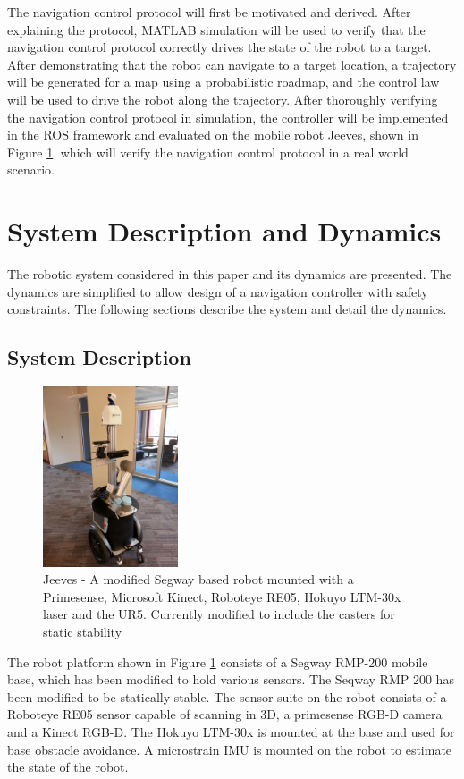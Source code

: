 \documentclass[journal]{IEEEtran}
\begin{document}
The navigation control protocol will first be motivated and derived. After explaining the protocol, MATLAB simulation will be used to verify that the navigation control protocol correctly drives the state of the robot to a target. After demonstrating that the robot can navigate to a target location, a trajectory will be generated for a map using a probabilistic roadmap, and the control law will be used to drive the robot along the trajectory. After thoroughly verifying the navigation control protocol in simulation, the controller will be implemented in the ROS framework and evaluated on the mobile robot Jeeves, shown in Figure \ref{fig:jeeves}, which will verify the navigation control protocol in a real world scenario.

\section{System Description and Dynamics}
The robotic system considered in this paper and its dynamics are presented. The dynamics are simplified to allow design of a navigation controller with safety constraints. The following sections describe the system and detail the dynamics.
   
\subsection{System Description}
\begin{figure}
    \centering
    \includegraphics[width = 4cm, scale=0.2]{jeeves2_0.jpg}
    \caption{Jeeves - A modified Segway based robot mounted with a Primesense, Microsoft Kinect, Roboteye RE05, Hokuyo LTM-30x laser and the UR5. Currently modified to include the casters for static stability}
    \label{fig:jeeves}
\end{figure}

The robot platform shown in Figure \ref{fig:jeeves} consists of a Segway RMP-200 mobile base, which has been
modified to hold various sensors. The Seqway RMP 200 has been modified to be statically stable. The sensor suite on the robot consists of a Roboteye RE05 sensor capable of scanning in 3D, a primesense RGB-D camera and a Kinect RGB-D. The Hokuyo LTM-30x is mounted at the base and used for base obstacle avoidance. A microstrain IMU is mounted on the robot to estimate the state of the robot.
\end{document}
